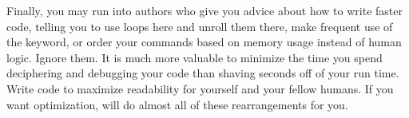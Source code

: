 Finally, you may run into authors who give you advice about how to write
faster code, telling you to use loops here and unroll them there, make
frequent use of the  keyword, or order your commands based
on memory usage instead of human logic. Ignore them. It is much more
valuable to minimize the time you spend deciphering and debugging your
code than shaving seconds off of your run time.  Write code to maximize
readability for yourself and your fellow humans. If you want optimization,
 will do almost all of these rearrangements for you.




